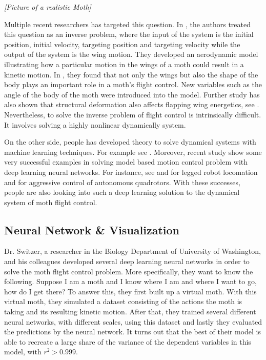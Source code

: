 \documentclass[sigchi]{acmart}
\begin{document}
\emph{\color{blue} [Picture of a realistic Moth]}

Multiple recent researchers has targeted this question. In \cite{Hedrick3114}, the authors treated this question as an inverse problem, where the input of the system is the initial position, initial velocity, targeting position and targeting velocity while the output of the system is the wing motion. They developed an aerodynamic model illustrating how a particular motion in the wings of a moth could result in a kinetic motion. In \cite{Dyhr1523}, they found that not only the wings but also the shape of the body plays an important role in a moth's flight control. New variables such as the angle of the body of the moth were introduced into the model. Further study has also shown that structural deformation also affects flapping wing energetics, see \citep{Jankauski_2018}. Nevertheless, to solve the inverse problem of flight control is intrinsically difficult. It involves solving a highly nonlinear dynamically system. 

On the other side, people has developed theory to solve dynamical systems with machine learning techniques. For example see \cite{WilliamsRD15}. Moreover, recent study show some very successful examples in solving model based motion control problem with deep learning neural networks. For instance, see \cite{Kalakrishnan} and \cite{Tassa} for legged robot locomation and \cite{Mellinger} for aggressive control of autonomous quadrotors. With these successes, people are also looking into such a deep learning solution to the dynamical system of moth flight control.

\subsection{Neural Network \& Visualization}

Dr. Switzer, a researcher in the Biology Department of University of Washington, and his colleagues developed several deep learning neural networks in order to solve the moth flight control problem. More specifically, they want to know the following. Suppose I am a moth and I know where I am and where I want to go, how do I get there? To answer this, they first built up a virtual moth. With this virtual moth, they simulated a dataset consisting of the actions the moth is taking and its resulting kinetic motion. After that, they trained several different neural networks, with different scales, using this dataset and lastly they evaluated the predictions by the neural network. It turns out that the best of their model is able to recreate a large share of the variance of the dependent variables in this model, with $r^2 > 0.999$.
\end{document}

